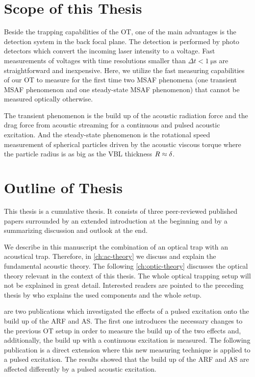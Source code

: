 \section{Scope of this Thesis}

Beside the trapping capabilities of the OT, one of the main advantages is the 
detection system in the back focal plane. The detection is performed by photo 
detectors which convert the incoming laser intensity to a voltage. Fast 
measurements of voltages with time resolutions smaller than $\Delta t < 
\SI{1}{\us}$ are straightforward and inexpensive. Here, we utilize the fast 
measuring capabilities of our OT to measure for the first time two MSAF 
phenomena (one transient MSAF phenomenon and one steady-state MSAF phenomenon) 
that cannot be measured optically otherwise.

The transient phenomenon is the build up of the acoustic radiation force and 
the drag force from acoustic streaming for a continuous and pulsed acoustic 
excitation. And the steady-state phenomenon is the rotational speed 
measurement of spherical particles driven by the acoustic viscous torque where 
the particle radius is as big as the VBL thickness $R\approx\delta$.

\section{Outline of Thesis\label{sec:I-outline}}

This thesis is a cumulative thesis. It consists of three peer-reviewed 
published papers surrounded by an extended introduction at the beginning and by 
a summarizing discussion and outlook at the end.

We describe in this manuscript the combination of an optical trap with an 
acoustical trap. Therefore, in \cref{ch:ac-theory} we discuss and explain the 
fundamental acoustic theory. The following \cref{ch:optic-theory} discusses the 
optical theory relevant in the context of this thesis. The whole optical 
trapping setup will not be explained in great detail. Interested readers are 
pointed to the preceding thesis by  who explains the used 
components and the whole setup.

 are two publications which investigated the 
effects of a pulsed excitation onto the build up of the ARF and AS. The first 
one introduces the necessary changes to the previous OT setup in order to 
measure the build up of the two effects and, additionally, the build up with a 
continuous excitation is measured. The following publication is a direct 
extension where this new measuring technique is applied to a pulsed excitation. 
The results showed that the build up of the ARF and AS are affected differently 
by a pulsed acoustic excitation.

